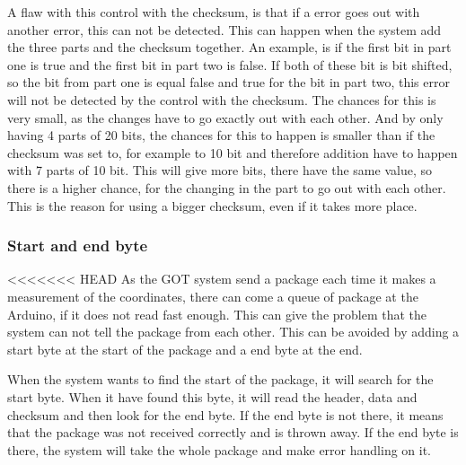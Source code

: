 A flaw with this control with the checksum, is that if a error goes out with another error, this can not be detected. This can happen when the system add the three parts and the checksum together. An example, is if the first bit in part one is true and the first bit in part two is false. If both of these bit is bit shifted, so the bit from part one is equal false and true for the bit in part two, this error will not be detected by the control with the checksum. The chances for this is very small, as the changes have to go exactly out with each other. And by only having 4 parts of 20 bits, the chances for this to happen is smaller than if the checksum was set to, for example to 10 bit and therefore addition have to happen with 7 parts of 10 bit. This will give more bits, there have the same value, so there is a higher chance, for the changing in the part to go out with each other. This is the reason for using a bigger checksum, even if it takes more place.

\subsubsection{Start and end byte}
<<<<<<< HEAD
As the GOT system send a package each time it makes a measurement of the coordinates, there can come a queue of package at the Arduino, if it does not read fast enough. This can give the problem that the system can not tell the package from each other. This can be avoided by adding a start byte at the start of the package and a end byte at the end. 

When the system wants to find the start of the package, it will search for the start byte. When it have found this byte, it will read the header, data and checksum and then look for the end byte. If the end byte is not there, it means that the package was not received correctly and is thrown away. If the end byte is there, the system will take the whole package and make error handling on it. 

